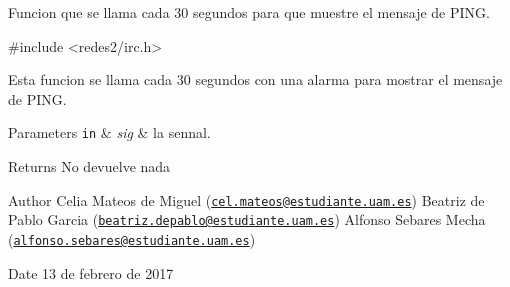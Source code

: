 Funcion que se llama cada 30 segundos para que muestre el mensaje de P\+I\+NG.


\begin{DoxyCode}
\textcolor{preprocessor}{#include <redes2/irc.h>}
\end{DoxyCode}


Esta funcion se llama cada 30 segundos con una alarma para mostrar el mensaje de P\+I\+NG.


\begin{DoxyParams}[1]{Parameters}
\mbox{\tt in}  & {\em sig} & la sennal.\\
\hline
\end{DoxyParams}
\begin{DoxyReturn}{Returns}
No devuelve nada
\end{DoxyReturn}
\begin{DoxyAuthor}{Author}
Celia Mateos de Miguel (\href{mailto:cel.mateos@estudiante.uam.es}{\tt cel.\+mateos@estudiante.\+uam.\+es}) Beatriz de Pablo Garcia (\href{mailto:beatriz.depablo@estudiante.uam.es}{\tt beatriz.\+depablo@estudiante.\+uam.\+es}) Alfonso Sebares Mecha (\href{mailto:alfonso.sebares@estudiante.uam.es}{\tt alfonso.\+sebares@estudiante.\+uam.\+es})
\end{DoxyAuthor}
\begin{DoxyDate}{Date}
13 de febrero de 2017
\end{DoxyDate}


 